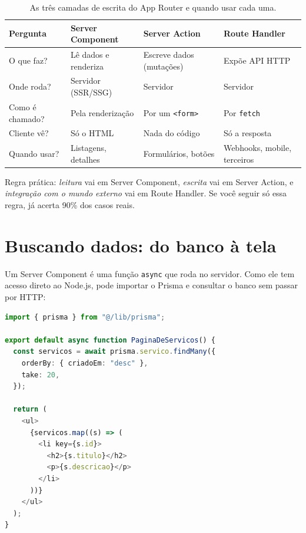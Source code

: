 \begin{table}[h]
\centering
\small
\caption{As três camadas de escrita do App Router e quando usar cada uma.}
\label{tab:camadas-next}
\begin{tabularx}{\textwidth}{@{}>{\raggedright\arraybackslash}p{2.6cm} >{\raggedright\arraybackslash}X >{\raggedright\arraybackslash}X >{\raggedright\arraybackslash}X@{}}
\toprule
\textbf{Pergunta} & \textbf{Server Component} & \textbf{Server Action} & \textbf{Route Handler} \\
\midrule
O que faz? & Lê dados e renderiza & Escreve dados (mutações) & Expõe API HTTP \\
Onde roda? & Servidor (SSR/SSG) & Servidor & Servidor \\
Como é chamado? & Pela renderização & Por um \texttt{<form>} & Por \texttt{fetch} \\
Cliente vê? & Só o HTML & Nada do código & Só a resposta \\
Quando usar? & Listagens, detalhes & Formulários, botões & Webhooks, mobile, terceiros \\
\bottomrule
\end{tabularx}
\end{table}

\begin{caixadica}
Regra prática: \emph{leitura} vai em Server Component, \emph{escrita} vai em
Server Action, e \emph{integração com o mundo externo} vai em Route Handler.
Se você seguir só essa regra, já acerta 90\% dos casos reais.
\end{caixadica}

\section{Buscando dados: do banco à tela}

Um Server Component é uma função \texttt{async} que roda no servidor. Como ele
tem acesso direto ao Node.js, pode importar o Prisma e consultar o banco sem
passar por HTTP:

\begin{lstlisting}[style=livro, language=TypeScript,
  caption={Server Component lendo o banco direto.}, label={list:fullstack-server}]
import { prisma } from "@/lib/prisma";

export default async function PaginaDeServicos() {
  const servicos = await prisma.servico.findMany({
    orderBy: { criadoEm: "desc" },
    take: 20,
  });

  return (
    <ul>
      {servicos.map((s) => (
        <li key={s.id}>
          <h2>{s.titulo}</h2>
          <p>{s.descricao}</p>
        </li>
      ))}
    </ul>
  );
}
\end{lstlisting}

